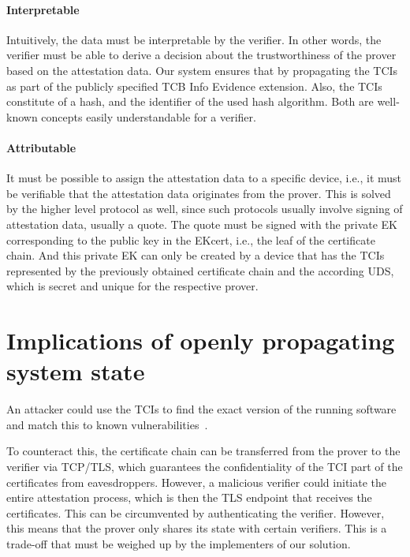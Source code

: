 \paragraph{Interpretable}
Intuitively, the data must be interpretable by the verifier.
In other words, the verifier must be able to derive a decision about the trustworthiness of the prover based on the attestation data.
Our system ensures that by propagating the TCIs as part of the publicly specified TCB Info Evidence extension.
Also, the TCIs constitute of a hash, and the identifier of the used hash algorithm.
Both are well-known concepts easily understandable for a verifier.

\paragraph{Attributable}
It must be possible to assign the attestation data to a specific device, i.e., it must be verifiable that the attestation data originates from the prover.
This is solved by the higher level protocol as well, since such protocols usually involve signing of attestation data, usually a quote.
The quote must be signed with the private EK corresponding to the public key in the EKcert, i.e., the leaf of the certificate chain.
And this private EK can only be created by a device that has the TCIs represented by the previously obtained certificate chain and the according \ac{UDS}, which is secret and unique for the respective prover.



\section{Implications of openly propagating system state}

An attacker could use the TCIs to find the exact version of the running software and match this to known vulnerabilities~\cite{rfc9334}.

To counteract this, the certificate chain can be transferred from the prover to the verifier via TCP/TLS, which guarantees the confidentiality of the TCI part of the certificates from eavesdroppers.
However, a malicious verifier could initiate the entire attestation process, which is then the TLS endpoint that receives the certificates.
This can be circumvented by authenticating the verifier.
However, this means that the prover only shares its state with certain verifiers.
This is a trade-off that must be weighed up by the implementers of our solution.


